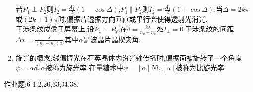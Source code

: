 \documentclass{article}
\begin{document}
\begin{enumerate}
    若$P_1\perp P_2$则$I_2=\frac{A_1^2}{2}(1-\cos\Delta)$,$P_1\parallel P_2$则$I_2=\frac{A_1^2}{2}(1+\cos\Delta)$.当$\Delta=2k\pi$或$(2k+1)\pi$时,偏振片透振方向垂直或平行会使得透射光消光.\\
    干涉条纹成像于屏幕上,设$P_1\perp P_2$,在$d=\frac{k\lambda}{n_{\text{o}}-n_{\text{e}}}$处$I_\perp=0$.干涉条纹的间距$\Delta x=\frac{\lambda}{(n_{\text{o}}-n_{\text{e}})\alpha}$,其中$\alpha$是波晶片晶楔夹角.
    \item 旋光的概念:线偏振光在石英晶体内沿光轴传播时,偏振面被旋转了一个角度$\psi=\alpha d,\alpha$被称为旋光率.在量糖术中$\psi=[\alpha]Nl,[\alpha]$被称为比旋光率.
\end{enumerate}
作业题:6-1,2,20,33,34,38.
\end{document}

